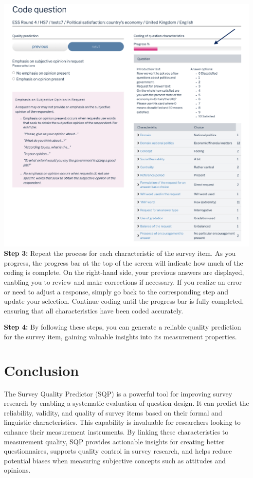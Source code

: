 \documentclass[
  letterpaper,
  DIV=11,
  numbers=noendperiod]{scrartcl}
\begin{document}
\begin{tcolorbox}
\includegraphics{img/progress.png} \textbf{Step 3:} Repeat the process
for each characteristic of the survey item. As you progress, the
progress bar at the top of the screen will indicate how much of the
coding is complete. On the right-hand side, your previous answers are
displayed, enabling you to review and make corrections if necessary. If
you realize an error or need to adjust a response, simply go back to the
corresponding step and update your selection. Continue coding until the
progress bar is fully completed, ensuring that all characteristics have
been coded accurately.

\textbf{Step 4:} By following these steps, you can generate a reliable
quality prediction for the survey item, gaining valuable insights into
its measurement properties.

\end{tcolorbox}

\section{Conclusion}\label{conclusion}

The Survey Quality Predictor (SQP) is a powerful tool for improving
survey research by enabling a systematic evaluation of question design.
It can predict the reliability, validity, and quality of survey items
based on their formal and linguistic characteristics. This capability is
invaluable for researchers looking to enhance their measurement
instruments. By linking these characteristics to measurement quality,
SQP provides actionable insights for creating better questionnaires,
supports quality control in survey research, and helps reduce potential
biases when measuring subjective concepts such as attitudes and
opinions.
\end{document}
